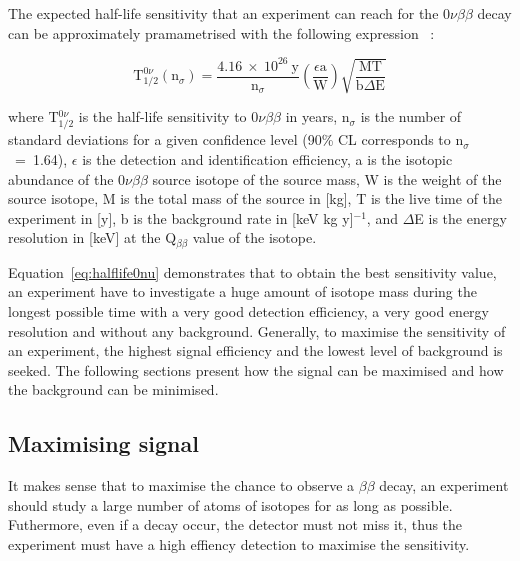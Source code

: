 \documentclass[main.tex]{subfiles}
\begin{document}
\NI The expected half-life sensitivity that an experiment can reach for the 0$\nu\beta\beta$ decay can be approximately pramametrised with the following expression~\cite{formulaSensBB} : 


\begin{equation}\label{eq:sensitivity0nu}
\text{T}_{\text{1/2}}^{0\nu} (\text{n}_\sigma) = \frac{\text{4.16}~\times~\text{10}^{\text{26}}~\text{y}}{\text{n}_\sigma} \left(\frac{\epsilon \text{a}}{\text{W}} \right) \sqrt{\frac{\text{MT}}{\text{b}\Delta\text{E}}}
\end{equation}


\bigskip


\NI where T$_{\text{1/2}}^{0\nu}$ is the half-life sensitivity to 0$\nu\beta\beta$ in years, n$_\sigma$ is the number of standard deviations for a given confidence level (90\% CL corresponds to n$_\sigma$~=~1.64), $\epsilon$ is the detection and identification efficiency, a is the isotopic abundance of the 0$\nu\beta\beta$ source isotope of the source mass, W is the weight of the source isotope, M is the total mass of the source in [kg], T is the live time of the experiment in [y], b is the background rate in [keV kg y]$^{-\text{1}}$, and $\Delta$E is the energy resolution in [keV] at the Q$_{\beta\beta}$ value of the isotope. 


\bigskip


\NI Equation~\ref{eq:halflife0nu} demonstrates that to obtain the best sensitivity value, an experiment have to investigate a huge amount of isotope mass during the longest possible time with a very good detection efficiency, a very good energy resolution and without any background. Generally, to maximise the sensitivity of an experiment, the highest signal efficiency and the lowest level of background is seeked. The following sections present how the signal can be maximised and how the background can be minimised. 


\subsection{Maximising signal}


\NI It makes sense that to maximise the chance to observe a $\beta\beta$ decay, an experiment should study a large number of atoms of isotopes for as long as possible. Futhermore, even if a decay occur, the detector must not miss it, thus the experiment must have a high effiency detection to maximise the sensitivity.


\bigskip
\end{document}
